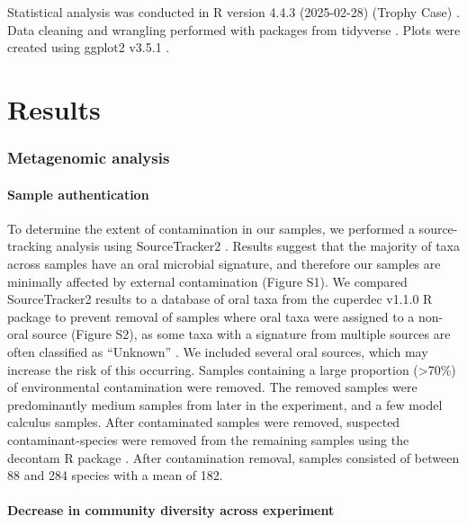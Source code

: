 \documentclass[10pt,a4paper]{article}
\begin{document}
Statistical analysis was conducted in R version 4.4.3 (2025-02-28)
(Trophy Case) \citep{Rbase}. Data cleaning and wrangling performed with
packages from tidyverse \citep{tidyverse2019}. Plots were created using
ggplot2 v3.5.1 \citep{ggplot2}.

\section{Results}\label{results}

\subsubsection{Metagenomic analysis}\label{metagenomic-analysis}

\paragraph{Sample authentication}\label{sample-authentication}

To determine the extent of contamination in our samples, we performed a
source-tracking analysis using SourceTracker2
\citep{knightsSourceTracker2011}. Results suggest that the majority of
taxa across samples have an oral microbial signature, and therefore our
samples are minimally affected by external contamination (Figure S1). We
compared SourceTracker2 results to a database of oral taxa from the
cuperdec v1.1.0 R package \citep{yatesOralMicrobiome2021} to prevent
removal of samples where oral taxa were assigned to a non-oral source
(Figure S2), as some taxa with a signature from multiple sources are
often classified as ``Unknown'' \citep{velskoMicrobialDifferences2019}.
We included several oral sources, which may increase the risk of this
occurring. Samples containing a large proportion (\textgreater70\%) of
environmental contamination were removed. The removed samples were
predominantly medium samples from later in the experiment, and a few
model calculus samples. After contaminated samples were removed,
suspected contaminant-species were removed from the remaining samples
using the decontam R package \citep{Rdecontam}. After contamination
removal, samples consisted of between 88 and 284 species with a mean of
182.

\paragraph{Decrease in community diversity across
experiment}\label{decrease-in-community-diversity-across-experiment}
\end{document}

